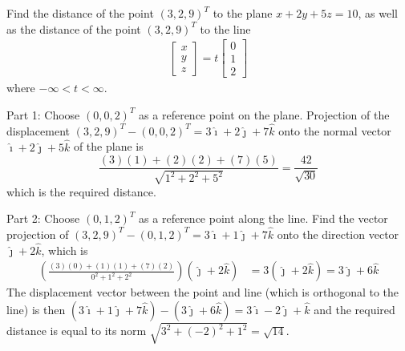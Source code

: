 \begin{Exercise}
\label{ex:dist_pt_line_R3}
Find the distance of the point $(3,2,9)^T$ to the plane $x + 2y + 5z = 10$, as well as the distance of the point $(3,2,9)^T$ to the line 
\begin{align*}
\begin{bmatrix}
x\\
y\\
z
\end{bmatrix}
=
t
\begin{bmatrix}
0\\
1\\
2
\end{bmatrix}
\end{align*}
where $-\infty < t < \infty$.
\end{Exercise}
\begin{Answer}
Part 1: Choose $(0,0,2)^T$ as a reference point on the plane. Projection of the displacement $(3,2,9)^T - (0,0,2)^T = 3\hat{\imath} + 2\hat{\jmath} + 7\hat{k}$ onto the normal vector $\hat{\imath} + 2\hat{\jmath} + 5\hat{k}$ of the plane is
\[\frac{(3)(1)+(2)(2)+(7)(5)}{\sqrt{1^2 + 2^2 + 5^2}} = \frac{42}{\sqrt{30}}\] which is the required distance.\par
Part 2: Choose $(0,1,2)^T$ as a reference point along the line. Find the vector projection of $(3,2,9)^T - (0,1,2)^T = 3\hat{\imath} + 1\hat{\jmath} + 7\hat{k}$ onto the direction vector $\hat{\jmath} + 2\hat{k}$, which is
\begin{align*}
\left(\frac{(3)(0)+(1)(1)+(7)(2)}{0^2 + 1^2 + 2^2}\right) (\hat{\jmath} + 2\hat{k}) &= 3(\hat{\jmath} + 2\hat{k}) = 3\hat{\jmath} + 6\hat{k}
\end{align*}
The displacement vector between the point and line (which is orthogonal to the line) is then $(3\hat{\imath} + 1\hat{\jmath} + 7\hat{k}) - (3\hat{\jmath} + 6\hat{k}) = 3\hat{\imath} - 2\hat{\jmath} + \hat{k}$ and the required distance is equal to its norm $\sqrt{3^2 + (-2)^2 + 1^2} = \sqrt{14}$.
\end{Answer}


